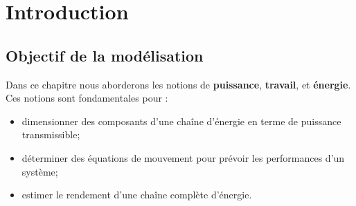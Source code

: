 \def\xxactivite{Cours}
\def\xxauteur{\textsl{Émilien Durif \\ Xavier Pessoles}}

\fichefalse
\proftrue
\tdfalse
\courstrue

\def\xxnumchapitre{Chapitre 1 \vspace{.2cm}}
\def\xxchapitre{\hspace{.12cm} Approche énergétique}

\def\xxcompetences{%
\textsl{%
\textbf{Savoirs et compétences :}\\
\begin{itemize}[label=\ding{112},font=\color{ocre}] 
\item \textit{Mod2.C16} : torseur cinétique
\item \textit{Mod2.C17} : torseur dynamique
\item \textit{Res1.C1.SF1} : proposer une démarche permettant la détermination de la loi de mouvement
\end{itemize}
}}



\def\xxfigures{
}%



\vspace{2cm}
\pagestyle{fancy}
\thispagestyle{plain}



\section{Introduction}
\subsection{Objectif de la modélisation}
Dans ce chapitre nous aborderons les notions de \textbf{puissance}, \textbf{travail}, et \textbf{énergie}. Ces notions sont fondamentales pour :
\begin{itemize}
\item dimensionner des composants d'une chaîne d'énergie en terme de puissance transmissible;
\item déterminer des équations de mouvement pour prévoir les performances d'un système;
\item estimer le rendement d'une chaîne complète d'énergie.
\end{itemize}



